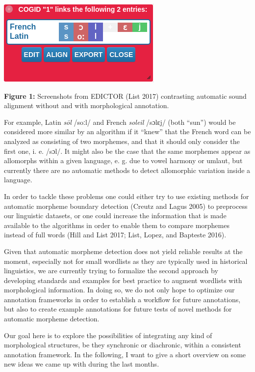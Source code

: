 \documentclass[
  english,
  a4paper,
  oneside,tablecaptionabove
]{scrbook}
\begin{document}
\begin{center}
\includegraphics{images/__f.hypotheses.org_wp-content_blogs.dir_4500_files_2018_10_Graphik2.png}
\end{center}

\textbf{Figure 1:} Screenshots from EDICTOR (List 2017) contrasting
automatic sound alignment without and with morphological annotation.

For example, Latin \emph{sōl} /soːl/ and French \emph{soleil} /sɔlɛj/
(both \enquote{sun}) would be considered more similar by an algorithm if
it \enquote{knew} that the French word can be analyzed as consisting of
two morphemes, and that it should only consider the first one, i. e.
/sɔl/. It might also be the case that the same morphemes appear as
allomorphs within a given language, e. g. due to vowel harmony or
umlaut, but currently there are no automatic methods to detect
allomorphic variation inside a language.

In order to tackle these problems one could either try to use existing
methods for automatic morpheme boundary detection (Creutz and Lagus
2005) to preprocess our linguistic datasets, or one could increase the
information that is made available to the algorithms in order to enable
them to compare morphemes instead of full words (Hill and List 2017;
List, Lopez, and Bapteste 2016).

Given that automatic morpheme detection does not yield reliable results
at the moment, especially not for small wordlists as they are typically
used in historical linguistics, we are currently trying to formalize the
second approach by developing standards and examples for best practice
to augment wordlists with morphological information. In doing so, we do
not only hope to optimize our annotation frameworks in order to
establish a workflow for future annotations, but also to create example
annotations for future tests of novel methods for automatic morpheme
detection.

Our goal here is to explore the possibilities of integrating any kind of
morphological structures, be they synchronic or diachronic, within a
consistent annotation framework. In the following, I want to give a
short overview on some new ideas we came up with during the last months.
\end{document}
